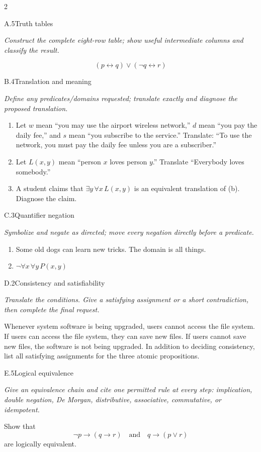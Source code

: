 \documentclass[9pt]{extarticle}
\begin{document}
\begin{multicols}{2}
\begin{CoreProblem}{A.5}{Truth tables}
{\scriptsize\textit{Construct the complete eight-row table; show useful intermediate columns and classify the result.}\par}
\[
  (p\leftrightarrow q)\lor(\neg q\leftrightarrow r)
\]
\end{CoreProblem}
\begin{CoreProblem}{B.4}{Translation and meaning}
{\scriptsize\textit{Define any predicates/domains requested; translate exactly and diagnose the proposed translation.}\par}
\begin{enumerate}[label=(\alph*)]
  \item Let $w$ mean ``you may use the airport wireless network,'' $d$ mean
        ``you pay the daily fee,'' and $s$ mean ``you subscribe to the
        service.'' Translate: ``To use the network, you must pay the daily fee
        unless you are a subscriber.''
  \item Let $L(x,y)$ mean ``person $x$ loves person $y$.'' Translate
        ``Everybody loves somebody.''
  \item A student claims that $\exists y\,\forall x\,L(x,y)$ is an equivalent
        translation of (b). Diagnose the claim.
\end{enumerate}
\end{CoreProblem}
\begin{CoreProblem}{C.3}{Quantifier negation}
{\scriptsize\textit{Symbolize and negate as directed; move every negation directly before a predicate.}\par}
\begin{enumerate}[label=(\alph*)]
  \item Some old dogs can learn new tricks. The domain is all things.
  \item $\neg\forall x\,\forall y\,P(x,y)$
\end{enumerate}
\end{CoreProblem}
\columnbreak
\begin{CoreProblem}{D.2}{Consistency and satisfiability}
{\scriptsize\textit{Translate the conditions. Give a satisfying assignment or a short contradiction, then complete the final request.}\par}
Whenever system software is being upgraded, users cannot access the file
system. If users can access the file system, they can save new files. If users
cannot save new files, the software is not being upgraded. In addition to
deciding consistency, list all satisfying assignments for the three atomic
propositions.
\end{CoreProblem}
\begin{CoreProblem}{E.5}{Logical equivalence}
{\scriptsize\textit{Give an equivalence chain and cite one permitted rule at every step: implication, double negation, De Morgan, distributive, associative, commutative, or idempotent.}\par}
Show that
\[
  \neg p\to(q\to r)
  \quad\text{and}\quad
  q\to(p\lor r)
\]
are logically equivalent.
\end{CoreProblem}
\end{multicols}
\end{document}
